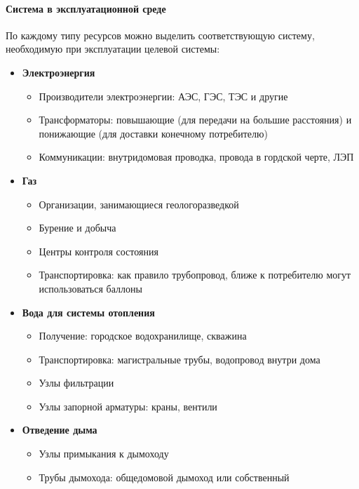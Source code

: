 \documentclass[bibliography=totocnumbered]{scrartcl}
\begin{document}
\paragraph{Система в эксплуатационной среде}
По каждому типу ресурсов можно выделить соответствующую систему, необходимую при эксплуатации целевой системы:

\begin{itemize}
  \item
    \textbf{Электроэнергия}
    \begin{itemize}
      \item Производители электроэнергии: АЭС, ГЭС, ТЭС и другие
      \item Трансформаторы: повышающие (для передачи на большие расстояния) и понижающие (для доставки конечному потребителю)   
      \item Коммуникации: внутридомовая проводка, провода в гордской черте, ЛЭП
    \end{itemize}
  
  \item
    \textbf{Газ}
    \begin{itemize}
      \item Организации, занимающиеся геологоразведкой
      \item Бурение и добыча
      \item Центры контроля состояния
      \item Транспортировка: как правило трубопровод, ближе к потребителю могут использоваться баллоны
    \end{itemize}
  
  \item
    \textbf{Вода для системы отопления}
    \begin{itemize}
      \item Получение: городское водохранилище, скважина
      \item Транспортировка: магистральные трубы, водопровод внутри дома
      \item Узлы фильтрации
      \item Узлы запорной арматуры: краны, вентили
    \end{itemize}
  
  \item
    \textbf{Отведение дыма}
    \begin{itemize}
      \item Узлы примыкания к дымоходу
      \item Трубы дымохода: общедомовой дымоход или собственный
    \end{itemize}
\end{itemize}
\end{document}
